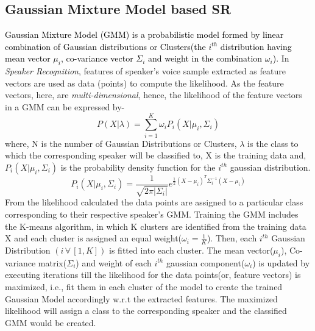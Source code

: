 \documentclass{article}
\begin{document}
\subsection{Gaussian Mixture Model based SR} 
\textcolor{black}{Gaussian Mixture Model (GMM) is a 
probabilistic model 
formed by linear combination of Gaussian distributions or Clusters(the $i^{th}$ distribution having mean vector $\mu_i$, co-variance vector $\Sigma_i$ and weight in the combination $\omega_i$)}. In 
\textit{Speaker Recognition}, features of speaker's voice sample 
extracted as feature vectors are used as data (points) to compute the likelihood. %
As the feature vectors, here, are \textit{multi-dimensional}, hence, the likelihood of the feature vectors in a GMM can be expressed by-
\begin{equation}
P(X|\lambda) = \sum\limits_{i=1}^K \omega_iP_i(X|\mu_i,\Sigma_i)
\end{equation}
where, N is the number of Gaussian Distributions or Clusters, \textbf{$\lambda$} is the class to which the corresponding speaker will be classified to, X is the training data and, $P_i(X|\mu_i,\Sigma_i)$ is the probability density function for the $i^{th}$ gaussian distribution.
\begin{equation}
P_i(X|\mu_i,\Sigma_i) = \frac{1}{\sqrt{2\pi|\Sigma_i|}}e^{\frac{1}{2}(X-\mu_i)^T\Sigma_i^{-1}(X-\mu_i)}
\end{equation}
From the likelihood calculated the data points are assigned to a particular class corresponding to their respective speaker's GMM. Training the GMM includes the K-means algorithm, in which K clusters are identified from the training data X and each cluster is assigned an equal weight($\omega_i = \frac{1}{K}$). Then, each $i^{th}$ Gaussian Distribution $(i\,\forall\,[1,K])$ is fitted into each cluster. The mean vector($\mu_i$), Co-variance matrix($\Sigma_i$) and weight of each $i^{th}$ gaussian component($\omega_i$) is updated by executing iterations till the likelihood for the data points(or, feature vectors) is maximized, i.e., fit them in each cluster of the model to create the trained Gaussian Model accordingly w.r.t the extracted features. The maximized likelihood will assign a class to the corresponding speaker and the classified GMM would be created. 
\end{document}
